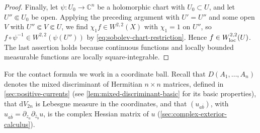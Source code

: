 \begin{proof}
Finally, let $\psi\colon U_0\to\mathbb C^n$ be a holomorphic chart with $U_0\subset U$, and let $U''\Subset U_0$ be open. Applying the preceding argument with $U'=U''$ and some open $V$ with $U''\Subset V\Subset U$, we find $\chi_1f\in W^{2,2}(X)$ with $\chi_1=1$ on $U''$, so $f\circ\psi^{-1}\in W^{2,2}(\psi(U''))$ by \eqref{eq:sobolev-chart-restriction}. Hence $f\in W^{2,2}_{\mathrm{loc}}(U)$. The last assertion holds because continuous functions and locally bounded measurable functions are locally square-integrable.
\end{proof}

For the contact formula we work in a coordinate ball. Recall that $D(A_1,\ldots,A_n)$ denotes the mixed discriminant of Hermitian $n\times n$ matrices, defined in \cref{sec:positive-currents} (see \cref{lem:mixed-discriminant-basic} for its basic properties), that $\mathrm dV_{2n}$ is Lebesgue measure in the coordinates, and that $(u_{a\bar b})$, with $u_{a\bar b}=\partial_{z_a}\partial_{\bar z_b}u$, is the complex Hessian matrix of $u$ (\cref{sec:complex-exterior-calculus}).

